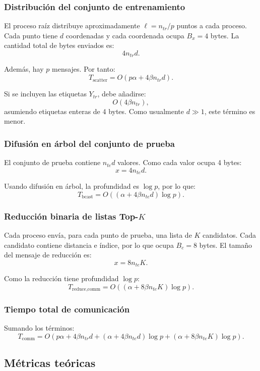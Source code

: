 \documentclass[11pt,a4paper]{article}
\begin{document}
\subsubsection{Distribución del conjunto de entrenamiento}

El proceso raíz distribuye aproximadamente $\ell = n_{tr}/p$ puntos a cada proceso. Cada punto
tiene $d$ coordenadas y cada coordenada ocupa $B_x = 4$ bytes. La cantidad total de bytes
enviados es:
\[
4n_{tr}d.
\]

Además, hay $p$ mensajes. Por tanto:
\[
T_{\text{scatter}}
=
O(p\alpha + 4\beta n_{tr}d).
\]

Si se incluyen las etiquetas $Y_{tr}$, debe añadirse:
\[
O(4\beta n_{tr}),
\]
asumiendo etiquetas enteras de 4 bytes. Como usualmente $d \gg 1$, este término es menor.

\subsubsection{Difusión en árbol del conjunto de prueba}

El conjunto de prueba contiene $n_{te}d$ valores. Como cada valor ocupa 4 bytes:
\[
x = 4n_{te}d.
\]

Usando difusión en árbol, la profundidad es $\log p$, por lo que:
\[
T_{\text{bcast}}
=
O\left(
(\alpha + 4\beta n_{te}d)\log p
\right).
\]

\subsubsection{Reducción binaria de listas Top-\texorpdfstring{$K$}{K}}

Cada proceso envía, para cada punto de prueba, una lista de $K$ candidatos. Cada candidato
contiene distancia e índice, por lo que ocupa $B_c = 8$ bytes. El tamaño del mensaje de
reducción es:
\[
x = 8n_{te}K.
\]

Como la reducción tiene profundidad $\log p$:
\[
T_{\text{reduce,comm}}
=
O\left(
(\alpha + 8\beta n_{te}K)\log p
\right).
\]

\subsubsection{Tiempo total de comunicación}

Sumando los términos:
\[
\boxed{
T_{\text{comm}}
=
O\left(
p\alpha
+
4\beta n_{tr}d
+
(\alpha + 4\beta n_{te}d)\log p
+
(\alpha + 8\beta n_{te}K)\log p
\right)
}.
\]

\subsection{Métricas teóricas}
\end{document}
